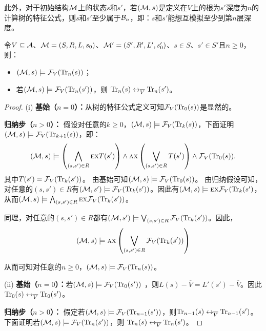 此外，对于初始结构${\cal M}$上的状态$s$和$s'$，若$({\cal M},s)$是定义在$V$上的根为$s'$深度为$n$的计算树的特征公式，则$s$和$s'$至少属于${\cal B}_n$，即：$s$和$s'$能想互模拟至少到第$n$层深度。

\begin{lemma}\label{Bn:to:Tn}
	令$V\subseteq {\cal A}$、${\cal M}=(S, R, L,s_0)$、${\cal M}'=(S', R', L',s_0')$、$s\in S$、$s'\in S'$且$n\ge 0$，则：
	\begin{itemize}
		\item[(i)] $({\cal M},s)\models{\cal F}_V(\textrm{Tr}_n(s))$；
		\item[(ii)] 若$({\cal M},s)\models{\cal F}_V(\textrm{Tr}_n(s'))$，则
		$\textrm{Tr}_n(s) \leftrightarrow_{\overline V} \textrm{Tr}_n(s')$。
	\end{itemize}
\end{lemma}
\begin{proof}
	(i) \textbf{基始（$n=0$）：}从树的特征公式定义可知${\cal F}_V(\textrm{Tr}_0(s))$是显然的。

	\textbf{归纳步（$n>0$）：} 假设对任意的$k\geq 0$，$({\cal M},s)\models{\cal F}_V(\textrm{Tr}_k(s))$，下面证明$({\cal M},s)\models{\cal F}_V(\textrm{Tr}_{k+1}(s))$，即：
	\begin{equation*}
		({\cal M},s)\models \left(\bigwedge_{(s,s')\in R}
		\textsc{e} \textsc{x} T(s')\right)
		\wedge \textsc{a} \textsc{x}\left(\bigvee_{(s,s')\in R}
		T(s')\right)
		\wedge {\cal F}_V(\textrm{Tr}_0(s)).
	\end{equation*}
	其中$T(s') ={\cal F}_V(\textrm{Tr}_k(s'))$。 
	由基始可知$({\cal M},s)\models {\cal F}_V(\textrm{Tr}_0(s))$。
	由归纳假设可知，对任意的$(s,s') \in R$有$({\cal M}, s') \models {\cal F}_V(\textrm{Tr}_k(s'))$。因此有$({\cal M},s)\models \textsc{e} \textsc{x} {\cal F}_V(\textrm{Tr}_k(s')$，从而$({\cal M},s)\models \bigwedge_{(s,s')\in R}
	\textsc{e} \textsc{x} {\cal F}_V(\textrm{Tr}_k(s'))$。
	
	同理，对任意的$(s,s') \in R$都有$({\cal M}, s') \models \bigvee_{(s,s')\in R} {\cal F}_V(\textrm{Tr}_k(s') )$。因此，
	$$({\cal M},s)\models \textsc{a} \textsc{x}\left(\bigvee_{(s,s')\in R}
	{\cal F}_V(\textrm{Tr}_k(s') )\right)$$
	
	从而可知对任意的$n\geq 0$，$({\cal M},s)\models{\cal F}_V(\textrm{Tr}_n(s))$。
	
	
	
	(ii) \textbf{基始（$n=0$）：}若$({\cal M}, s)  \models {\cal F}_V(\textrm{Tr}_0(s'))$ ，则$L(s) - \overline V = L'(s') - \overline V$。因此$\textrm{Tr}_0(s) \leftrightarrow_{\overline V} \textrm{Tr}_0(s')$。
	
	\textbf{归纳步（$n>0$）：} 假定若$({\cal M},s)\models{\cal F}_V(\textrm{Tr}_{n-1}(s'))$，则$\textrm{Tr}_{n-1}(s) \leftrightarrow_{\overline V} \textrm{Tr}_{n-1}(s')$。下面证明若$({\cal M},s)\models{\cal F}_V(\textrm{Tr}_n(s'))$，则
	$\textrm{Tr}_n(s) \leftrightarrow_{\overline V} \textrm{Tr}_n(s')$。
	

\end{proof}
